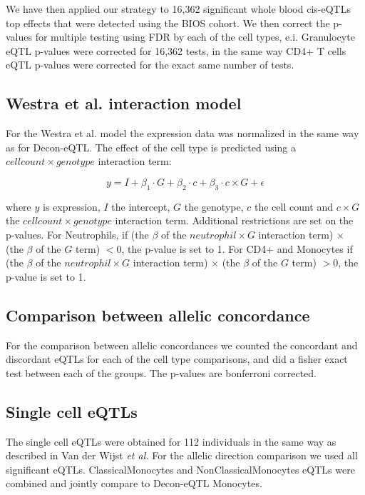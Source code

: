 We have then applied our strategy to 16,362 significant whole blood cis-eQTLs top effects that were detected using the BIOS cohort. We then correct the p-values for multiple testing using FDR by each of the cell types, e.i. Granulocyte eQTL p-values were corrected for 16,362 tests, in the same way CD4+ T cells eQTL p-values were corrected for the exact same number of tests.

\subsection{Westra et al. interaction model}
For the Westra et al. model the expression data was normalized in the same way as for Decon-eQTL. The effect of the cell type is predicted using a $cell count \times genotype$ interaction term:

\begin{equation}
y = I + \beta_{1} \cdot G + \beta_{2} \cdot c + \beta_{3} \cdot c \times G + \epsilon 
\end{equation}

where $y$ is expression, $I$ the intercept, $G$ the genotype,  $c$ the cell count and $c \times G$ the $cell count \times genotype$ interaction term. Additional restrictions are set on the p-values. For Neutrophils, if (the $\beta$ of the $neutrophil \times G$ interaction term) $\times$ (the $\beta$ of the $G$ term) $< 0$, the p-value is set to 1. For CD4+ and Monocytes if (the $\beta$ of the $neutrophil \times G$ interaction term) $\times$ (the $\beta$ of the $G$ term) $> 0$, the p-value is set to 1.

\subsection{Comparison between allelic concordance}
For the comparison between allelic concordances we counted the concordant and discordant eQTLs for each of the cell type comparisons, and did a fisher exact test between each of the groups. The p-values are bonferroni corrected.

\subsection{Single cell eQTLs}
The single cell eQTLs were obtained for 112 individuals in the same way as described in Van der Wijst \emph{et al.}\cite{wijstSinglecellRNASequencing2018} For the allelic direction comparison we used all significant eQTLs. ClassicalMonocytes and NonClassicalMonocytes eQTLs were combined and jointly compare to Decon-eQTL Monocytes. 

